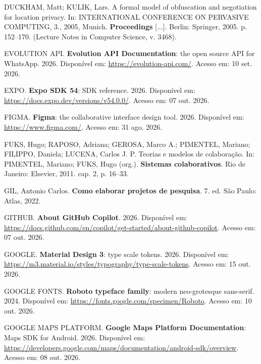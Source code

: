 \begin{flushleft}
\vspace{12pt}
\noindent DUCKHAM, Matt; KULIK, Lars. A formal model of obfuscation and negotiation for location privacy. In: INTERNATIONAL CONFERENCE ON PERVASIVE COMPUTING, 3., 2005, Munich. \textbf{Proceedings} [...]. Berlin: Springer, 2005. p. 152--170. (Lecture Notes in Computer Science, v. 3468).

\vspace{12pt}
\noindent EVOLUTION API. \textbf{Evolution API Documentation}: the open source API for WhatsApp. 2026. Disponível em: \url{https://evolution-api.com/}. Acesso em: 10 set. 2026.

\vspace{12pt}
\noindent EXPO. \textbf{Expo SDK 54}: SDK reference. 2026. Disponível em: \url{https://docs.expo.dev/versions/v54.0.0/}. Acesso em: 07 out. 2026.

\vspace{12pt}
\noindent FIGMA. \textbf{Figma}: the collaborative interface design tool. 2026. Disponível em: \url{https://www.figma.com/}. Acesso em: 31 ago. 2026.

\vspace{12pt}
\noindent FUKS, Hugo; RAPOSO, Adriana; GEROSA, Marco A.; PIMENTEL, Mariano; FILIPPO, Daniela; LUCENA, Carlos J. P. Teorias e modelos de colaboração. In: PIMENTEL, Mariano; FUKS, Hugo (org.). \textbf{Sistemas colaborativos}. Rio de Janeiro: Elsevier, 2011. cap. 2, p. 16--33.

\vspace{12pt}
\noindent GIL, Antonio Carlos. \textbf{Como elaborar projetos de pesquisa}. 7. ed. São Paulo: Atlas, 2022.

\vspace{12pt}
\noindent GITHUB. \textbf{About GitHub Copilot}. 2026. Disponível em: \url{https://docs.github.com/en/copilot/get-started/about-github-copilot}. Acesso em: 07 out. 2026.

\vspace{12pt}
\noindent GOOGLE. \textbf{Material Design 3}: type scale tokens. 2026. Disponível em: \url{https://m3.material.io/styles/typography/type-scale-tokens}. Acesso em: 15 out. 2026.

\vspace{12pt}
\noindent GOOGLE FONTS. \textbf{Roboto typeface family}: modern neo-grotesque sans-serif. 2024. Disponível em: \url{https://fonts.google.com/specimen/Roboto}. Acesso em: 10 out. 2026.

\vspace{12pt}
\noindent GOOGLE MAPS PLATFORM. \textbf{Google Maps Platform Documentation}: Maps SDK for Android. 2026. Disponível em: \url{https://developers.google.com/maps/documentation/android-sdk/overview}. Acesso em: 08 out. 2026.


\end{flushleft}
